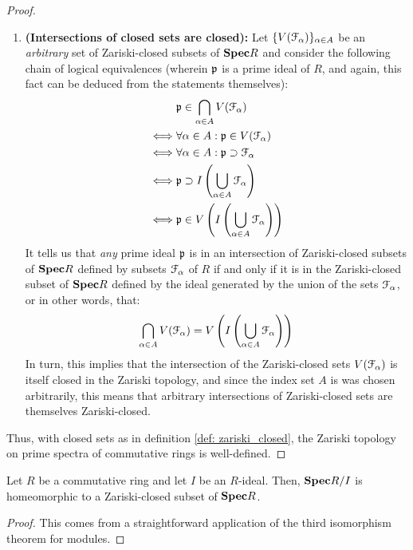 \begin{proof}
\begin{enumerate}
                                \item \textbf{(Intersections of closed sets are closed):} Let $\{V(\mathcal{F}_{\alpha})\}_{\alpha \in A}$ be an \textit{arbitrary} set of Zariski-closed subsets of $\mathbf{Spec} R$ and consider the following chain of logical equivalences (wherein $\mathfrak{p}$ is a prime ideal of $R$, and again, this fact can be deduced from the statements themselves):
                                    $$
                                        \begin{aligned}
                                            & \mathfrak{p} \in \bigcap_{\alpha \in A} V(\mathcal{F}_{\alpha})
                                            \\
                                            \iff & \forall \alpha \in A: \mathfrak{p} \in V(\mathcal{F}_{\alpha})
                                            \\
                                            \iff & \forall \alpha \in A: \mathfrak{p} \supset \mathcal{F}_{\alpha}
                                            \\
                                            \iff & \mathfrak{p} \supset I\left(\bigcup_{\alpha \in A} \mathcal{F}_{\alpha}\right)
                                            \\
                                            \iff & \mathfrak{p} \in V\left(I\left(\bigcup_{\alpha \in A} \mathcal{F}_{\alpha}\right)\right)
                                        \end{aligned}
                                    $$
                                It tells us that \textit{any} prime ideal $\mathfrak{p}$ is in an intersection of Zariski-closed subsets of $\mathbf{Spec} R$ defined by subsets $\mathcal{F}_{\alpha}$ of $R$ if and only if it is in the Zariski-closed subset of $\mathbf{Spec} R$ defined by the ideal generated by the union of the sets $\mathcal{F}_{\alpha}$, or in other words, that:
                                    $$\bigcap_{\alpha \in A} V(\mathcal{F}_{\alpha}) = V\left(I\left(\bigcup_{\alpha \in A} \mathcal{F}_{\alpha}\right)\right)$$
                                In turn, this implies that the intersection of the Zariski-closed sets $V(\mathcal{F}_{\alpha})$ is itself closed in the Zariski topology, and since the index set $A$ is was chosen arbitrarily, this means that arbitrary intersections of Zariski-closed sets are themselves Zariski-closed.
                            \end{enumerate}
                        Thus, with closed sets as in definition \ref{def: zariski_closed}, the Zariski topology on prime spectra of commutative rings is well-defined.
                    \end{proof}
                \begin{corollary} \label{coro: quotients_are_closed}
                    Let $R$ be a commutative ring and let $I$ be an $R$-ideal. Then, $\mathbf{Spec} R/I$ is homeomorphic to a Zariski-closed subset of $\mathbf{Spec} R$. 
                \end{corollary}
                    \begin{proof}
                        This comes from a straightforward application of the third isomorphism theorem for modules.
                    \end{proof}
                    
